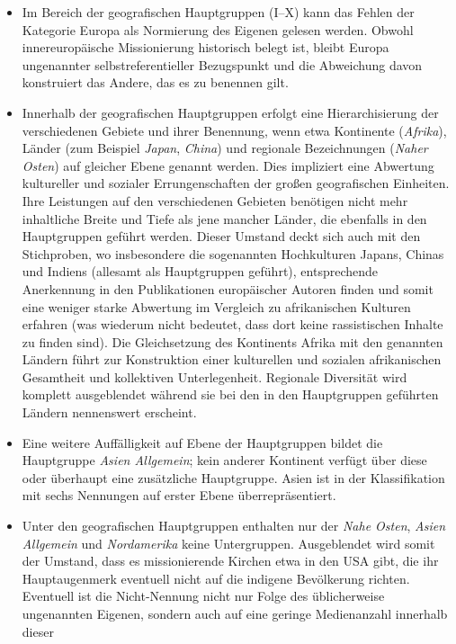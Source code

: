 \documentclass[a4paper,
fontsize=11pt,
oneside,
numbers=noperiodatend,
parskip=half-,
bibliography=totoc,
final
]{scrartcl}
\begin{document}
\begin{itemize}
\item
  Im Bereich der geografischen Hauptgruppen (I--X) kann das Fehlen der
  Kategorie Europa als Normierung des Eigenen gelesen werden. Obwohl
  innereuropäische Missionierung historisch belegt ist, bleibt Europa
  ungenannter selbstreferentieller Bezugspunkt und die Abweichung davon
  konstruiert das Andere, das es zu benennen gilt.
\item
  Innerhalb der geografischen Hauptgruppen erfolgt eine Hierarchisierung
  der verschiedenen Gebiete und ihrer Benennung, wenn etwa Kontinente
  (\emph{Afrika}), Länder (zum Beispiel \emph{Japan}, \emph{China}) und
  regionale Bezeichnungen (\emph{Naher Osten}) auf gleicher Ebene
  genannt werden. Dies impliziert eine Abwertung kultureller und
  sozialer Errungenschaften der großen geografischen Einheiten. Ihre
  Leistungen auf den verschiedenen Gebieten benötigen nicht mehr
  inhaltliche Breite und Tiefe als jene mancher Länder, die ebenfalls in
  den Hauptgruppen geführt werden. Dieser Umstand deckt sich auch mit
  den Stichproben, wo insbesondere die sogenannten Hochkulturen Japans,
  Chinas und Indiens (allesamt als Hauptgruppen geführt), entsprechende
  Anerkennung in den Publikationen europäischer Autoren finden und somit
  eine weniger starke Abwertung im Vergleich zu afrikanischen Kulturen
  erfahren (was wiederum nicht bedeutet, dass dort keine rassistischen
  Inhalte zu finden sind). Die Gleichsetzung des Kontinents Afrika mit
  den genannten Ländern führt zur Konstruktion einer kulturellen und
  sozialen afrikanischen Gesamtheit und kollektiven Unterlegenheit.
  Regionale Diversität wird komplett ausgeblendet während sie bei den in
  den Hauptgruppen geführten Ländern nennenswert erscheint.
\item
  Eine weitere Auffälligkeit auf Ebene der Hauptgruppen bildet die
  Hauptgruppe \emph{Asien Allgemein}; kein anderer Kontinent verfügt
  über diese oder überhaupt eine zusätzliche Hauptgruppe. Asien ist in
  der Klassifikation mit sechs Nennungen auf erster Ebene
  überrepräsentiert.
\item
  Unter den geografischen Hauptgruppen enthalten nur der \emph{Nahe
  Osten}, \emph{Asien Allgemein} und \emph{Nordamerika} keine
  Untergruppen. Ausgeblendet wird somit der Umstand, dass es
  missionierende Kirchen etwa in den USA gibt, die ihr Hauptaugenmerk
  eventuell nicht auf die indigene Bevölkerung richten. Eventuell ist
  die Nicht-Nennung nicht nur Folge des üblicherweise ungenannten
  Eigenen, sondern auch auf eine geringe Medienanzahl innerhalb dieser

\end{itemize}
\end{document}
